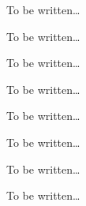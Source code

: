 \begin{command}{\pgfsys@animation@movealong{}}
  To be written\dots
\end{command}

\begin{command}{\pgfsys@animation@text{}}
  To be written\dots
\end{command}

\begin{command}{\pgfsys@animation@scalar{}}
  To be written\dots
\end{command}

\begin{command}{\pgfsys@animation@dimension{}}
  To be written\dots
\end{command}

\begin{command}{\pgfsys@animation@color@rgb{}}
  To be written\dots
\end{command}

\begin{command}{\pgfsys@animation@color@cmyk{}}
  To be written\dots
\end{command}

\begin{command}{\pgfsys@animation@color@cmy{}}
  To be written\dots
\end{command}

\begin{command}{\pgfsys@animation@color@gray{}}
  To be written\dots
\end{command}

